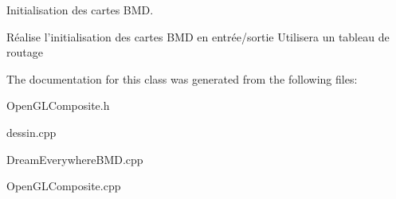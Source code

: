 Initialisation des cartes BMD. 

Réalise l'initialisation des cartes BMD en entrée/sortie Utilisera un tableau de routage 

The documentation for this class was generated from the following files:\begin{DoxyCompactItemize}
\item 
OpenGLComposite.h\item 
dessin.cpp\item 
DreamEverywhereBMD.cpp\item 
OpenGLComposite.cpp\end{DoxyCompactItemize}
